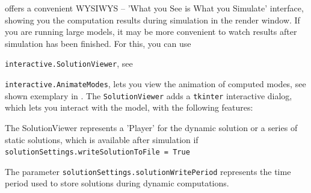 \codeName offers a convenient WYSIWYS -- 'What you See is What you Simulate' interface, showing you the computation results during simulation in the render window.
If you are running large models, it may be more convenient to watch results after simulation has been finished.
For this, you can use
\bi
  \item \texttt{interactive.SolutionViewer}, see  %
  \item \texttt{interactive.AnimateModes}, lets you view the animation of computed modes, see 
\ei
shown exemplary in .
The \texttt{SolutionViewer} adds a \texttt{tkinter} interactive dialog, which lets you interact with the model, with the following features:
\bi
\item The SolutionViewer represents a 'Player' for the dynamic solution or a series of static solutions, which is available after simulation if \texttt{solutionSettings.writeSolutionToFile = True}
\item The parameter \texttt{solutionSettings.solutionWritePeriod} represents the time period used to store solutions during dynamic computations.
